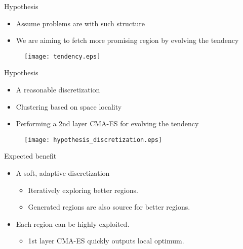 \begin{frame}{Hypothesis}
  \begin{itemize}
    \item Assume problems are with such structure
      \vspace*{10pt}
    \item We are aiming to fetch more promising region by evolving the
      tendency
  \end{itemize}
  \vspace*{10pt}
  \begin{figure}[hp]
    \centering
    \texttt{[image: tendency.eps]}
  \end{figure}
\end{frame}
\begin{frame}{Hypothesis}
  \begin{itemize}
    \item A reasonable discretization 
      \vspace*{10pt}
    \item Clustering based on space locality  
  \vspace*{10pt}
\item Performing a 2nd layer CMA-ES for evolving the tendency
  \end{itemize}
  \vspace*{10pt}
  \begin{figure}[htpb]
    \centering
    \texttt{[image: hypothesis\_discretization.eps]}
  \end{figure}
\end{frame}

\begin{frame}{Expected benefit}
  \begin{itemize}
    \item A soft, adaptive discretization
      \begin{itemize}
        \item Iteratively exploring better regions.
        \item Generated regions are also source for better regions.
      \end{itemize}
      \vspace*{14pt}
    \item Each region can be highly exploited. 
      \begin{itemize}
        \item 1st layer CMA-ES quickly outputs local optimum.
      \end{itemize}
  \end{itemize}
\end{frame}




